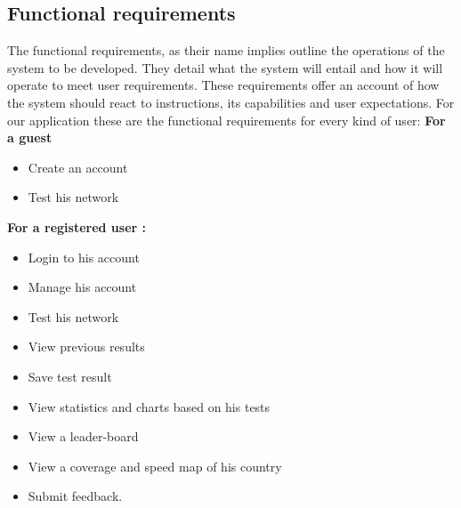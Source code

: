 \subsection{Functional requirements }
The functional requirements, as their name implies outline the operations of the system to be developed. They detail what the system will entail and how it will operate to meet user requirements. These requirements offer an account of how the system should react to instructions, its capabilities and user expectations. 
For our application these are the functional requirements for every kind of user: \newline
\textbf{For a guest }
\begin{itemize}
\renewcommand\labelitemi{\textbf{\Huge .}}
    \item Create an account 
    \item Test his network
\end{itemize} 
\textbf{For a registered user :}
\begin{itemize}
\renewcommand\labelitemi{\textbf{\Huge .}}
    \item Login to his account  
    \item Manage his account  
    \item Test his network 
    \item View previous results  
    \item Save test result 
    \item View  statistics and charts based on his tests
    \item View a leader-board  
    \item View a coverage and speed map of his country
    \item Submit  feedback.
\end{itemize} 
